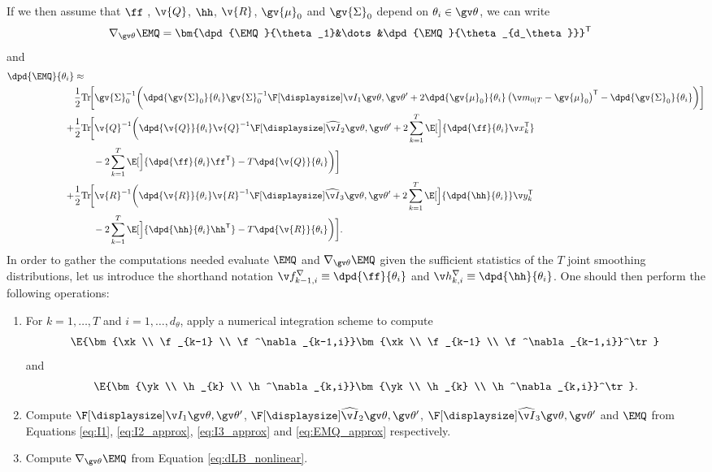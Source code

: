 If we then assume
that $\ff$ , $\v{Q}$, $\hh$, $\v{R}$, $\gv{\mu}_0$ and $\gv{\Sigma}_0$ depend on $\theta_i\in\Th$,
we can write
\begin{align}
	\nabla_{\Th}\EMQ &= \bm{\dpd{\EMQ}{\theta_1}&\dots&\dpd{\EMQ}{\theta_{d_\theta}}}^\tr
\end{align}
and
\begin{align}
\label{eq:dLB_nonlinear}
\begin{split}
	\dpd{\EMQ}{\theta_i}&\approx\\
%	
	&\frac{1}{2}\mathrm{Tr}\!\bigg[\gv{\Sigma}_0^{-1}\bigg(
	\dpd{\gv{\Sigma}_0}{\theta_i}\gv{\Sigma}_0^{-1}
	\II{1}
	+2\dpd{\gv{\mu}_0}{\theta_i}\left(\m_{0|T}-\gv{\mu}_0\right)^\tr
	-\dpd{\gv{\Sigma}_0}{\theta_i}\bigg)\bigg]\\
%	
	+&\frac{1}{2}\mathrm{Tr}\!\bigg[\v{Q}^{-1}\bigg(\dpd{\v{Q}}{\theta_i}\v{Q}^{-1}
	\III{2}
	+2\sum_{k=1}^T\E[\Big]{\dpd{\ff}{\theta_i}\x_k^\tr}\\%
	&\qquad-2\sum_{k=1}^T\E[\Big]{\dpd{\ff}{\theta_i}\ff^\tr}
	-T\dpd{\v{Q}}{\theta_i}\bigg)\bigg]\\
%	
	+&\frac{1}{2}\mathrm{Tr}\!\bigg[\v{R}^{-1}\bigg(\dpd{\v{R}}{\theta_i}\v{R}^{-1}
	\III{3}
	+2\sum_{k=1}^T\E[\Big]{\dpd{\hh}{\theta_i}}\y_k^\tr\\
	&\qquad-2\sum_{k=1}^T\E[\Big]{\dpd{\hh}{\theta_i}\hh^\tr}
	-T\dpd{\v{R}}{\theta_i}\bigg)\bigg].
\end{split}	
\end{align}
In order to gather the computations needed evaluate $\EMQ$ and $\nabla_{\Th}\EMQ$ given the sufficient statistics
of the $T$ joint smoothing distributions, let us introduce the shorthand notation 
$\f^{\nabla}_{k-1,i}\equiv\dpd{\ff}{\theta_i}$
and  $\h^\nabla_{k,i}\equiv\dpd{\hh}{\theta_i}$.
One should then
perform the following operations:
\begin{enumerate}
  \item For $k=1,\dots,T$ and $i=1,\dots,d_\theta$, apply a numerical integration scheme to compute
%  
\begin{align}
\E{\bm{\xk \\ \f_{k-1} \\ \f^\nabla_{k-1,i}}\bm{\xk \\ \f_{k-1} \\ \f^\nabla_{k-1,i}}^\tr} 		
\end{align}
and
\begin{align}
\E{\bm{\yk \\ \h_{k} \\ \h^\nabla_{k,i}}\bm{\yk \\ \h_{k} \\ \h^\nabla_{k,i}}^\tr}.		
\end{align}
\item Compute $\II{1}$, $\III{2}$, $\III{3}$ and $\EMQ$ from Equations
\eqref{eq:I1}, \eqref{eq:I2_approx}, \eqref{eq:I3_approx} and \eqref{eq:EMQ_approx} respectively.
\item Compute $\nabla_{\Th}\EMQ$ from Equation \eqref{eq:dLB_nonlinear}.
\end{enumerate}


